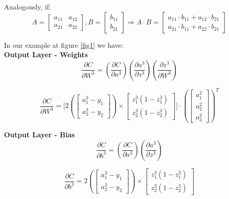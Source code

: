 \documentclass[12pt]{article}
\begin{document}
Analogously, if:
\[
A =
\begin{bmatrix}
a_{11} & a_{12}\\
a_{21} & a_{22}
\end{bmatrix}
, B = 
\begin{bmatrix}
b_{11}\\
b_{21}
\end{bmatrix}
\Rightarrow
A \cdot B = 
\begin{bmatrix}
a_{11}\cdot b_{11} + a_{12}\cdot b_{21}\\
a_{21}\cdot b_{11} + a_{22}\cdot b_{21}
\end{bmatrix}
\] 



In our example at figure \ref{fig1} we have:
\\
\textbf{Output Layer - Weights}
\begin{equation}
    \dfrac{\partial C}{\partial W^{3}} = \left( \dfrac{\partial C}{\partial a^{3}}\right) \left( \dfrac{\partial a^{3}}{\partial z^{3}}\right) \left(\dfrac{\partial z^{3}}{\partial W^{3}} \right)
\end{equation}

\begin{equation}
\dfrac{\partial C}{\partial W^{3}}
= \Bigg[
2\left(
\begin{bmatrix}
a_{1}^{3} - y_{1}\\
a_{2}^{3} - y_{2}
\end{bmatrix}
\right)
\times
\begin{bmatrix}
z_{1}^{3} ( 1 - z_{1}^{3} )\\
z_{2}^{3} ( 1 - z_{2}^{3})
\end{bmatrix}
\Bigg]
\cdot
\left(
\begin{bmatrix}
a_{1}^{2}\\
a_{2}^{2}\\
a_{3}^{2}
\end{bmatrix}
\right)^{T}
\end{equation} 

\textbf{Output Layer - Bias}
\begin{equation}
    \dfrac{\partial C}{\partial b^{3}} = \left( \dfrac{\partial C}{\partial a^{3}}\right) \left( \dfrac{\partial a^{3}}{\partial z^{3}}\right)
\end{equation}

\begin{equation}
\dfrac{\partial C}{\partial b^{3}}
= 2\left(
\begin{bmatrix}
a_{1}^{3} - y_{1}\\
a_{2}^{3} - y_{2}
\end{bmatrix}
\right)
\times
\begin{bmatrix}
z_{1}^{3} ( 1 - z_{1}^{3} )\\
z_{2}^{3} ( 1 - z_{2}^{3})
\end{bmatrix}
\end{equation} \mbox{} \\
\end{document}
